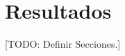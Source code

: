 \documentclass{subfiles}
\begin{document}
  \chapter{Resultados}
  \label{chap:results}

    [TODO: Definir Secciones.]
\end{document}
